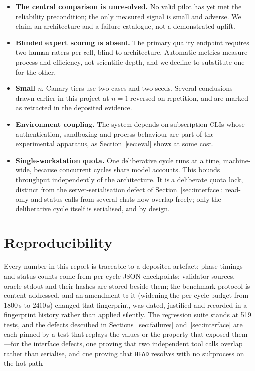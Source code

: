 \documentclass[11pt,a4paper]{article}
\newcommand{\code}[1]{\texttt{\small #1}}
\begin{document}
\begin{itemize}[leftmargin=*,itemsep=1pt]
  \item \textbf{The central comparison is unresolved.} No valid pilot has yet
        met the reliability precondition; the only measured signal is small and
        adverse. We claim an architecture and a failure catalogue, not a
        demonstrated uplift.
  \item \textbf{Blinded expert scoring is absent.} The primary quality endpoint
        requires two human raters per cell, blind to architecture. Automatic
        metrics measure process and efficiency, not scientific depth, and we
        decline to substitute one for the other.
  \item \textbf{Small $n$.} Canary tiers use two cases and two seeds. Several
        conclusions drawn earlier in this project at $n{=}1$ reversed on
        repetition, and are marked as retracted in the deposited evidence.
  \item \textbf{Environment coupling.} The system depends on subscription CLIs
        whose authentication, sandboxing and process behaviour are part of the
        experimental apparatus, as Section~\ref{sec:eval} shows at some cost.
  \item \textbf{Single-workstation quota.} One deliberative cycle runs at a
        time, machine-wide, because concurrent cycles share model accounts. This
        bounds throughput independently of the architecture. It is a deliberate
        quota lock, distinct from the server-serialisation defect of
        Section~\ref{sec:interface}: read-only and status calls from several
        chats now overlap freely; only the deliberative cycle itself is
        serialised, and by design.
\end{itemize}

\section{Reproducibility}

Every number in this report is traceable to a deposited artefact: phase timings
and status counts come from per-cycle JSON checkpoints; validator sources,
oracle stdout and their hashes are stored beside them; the benchmark protocol is
content-addressed, and an amendment to it (widening the per-cycle budget from
$1800$\,s to $2400$\,s) changed that fingerprint, was dated, justified and
recorded in a fingerprint history rather than applied silently. The regression
suite stands at 519 tests, and the defects described in
Sections~\ref{sec:failures} and~\ref{sec:interface} are each pinned by a test
that replays the values or the property that exposed them---for the interface
defects, one proving that two independent tool calls overlap rather than
serialise, and one proving that \code{HEAD} resolves with no subprocess on the
hot path.
\end{document}
